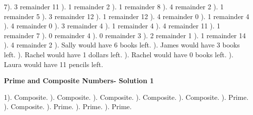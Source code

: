 \documentclass{article}%
\begin{document}
7). 3 remainder 11%
). 1 remainder 2%
). 1 remainder 8%
). 4 remainder 2%
). 1 remainder 5%
). 3 remainder 12%
). 1 remainder 12%
). 4 remainder 0%
). 1 remainder 4%
). 4 remainder 0%
). 3 remainder 4%
). 1 remainder 4%
). 4 remainder 11%
). 1 remainder 7%
). 0 remainder 4%
). 0 remainder 3%
). 2 remainder 1%
). 1 remainder 14%
). 4 remainder 2%
). Sally would have 6 books left.%
). James would have 3 books left.%
). Rachel would have 1 dollars left.%
). Rachel would have 0 books left.%
). Laura would have 11 pencils left.%
\newline%
\newpage%
\large%
\begin{center}%
\textbf{Prime and Composite Numbers- Solution 1}%
\newline%
\end{center} \normalsize%
1). Composite.%
). Composite.%
). Composite.%
). Composite.%
). Composite.%
). Prime.%
). Composite.%
). Prime.%
). Prime.%
). Prime.%
\end{document}
